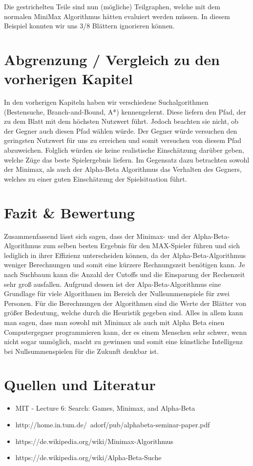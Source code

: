 Die gestrichelten Teile sind nun (mögliche) Teilgraphen, welche mit dem normalen MiniMax Algorithmus hätten evaluiert werden müssen. In diesem Beispiel konnten wir uns 3/8 Blättern ignorieren können.

\section{Abgrenzung / Vergleich zu den vorherigen Kapitel}

In den vorherigen Kapiteln haben wir verschiedene Suchalgorithmen (Bestensuche, Branch-and-Bound, A*) kennengelernt. Diese liefern den Pfad, der zu dem Blatt mit dem höchsten Nutzwert führt. Jedoch beachten sie nicht, ob der Gegner auch diesen Pfad wählen würde. Der Gegner würde versuchen den geringsten Nutzwert für uns zu erreichen und somit versuchen von diesem Pfad abzuweichen. Folglich würden sie keine realistische Einschätzung darüber geben, welche Züge das beste Spielergebnis liefern. Im Gegensatz dazu betrachten sowohl der Minimax, als auch der Alpha-Beta Algorithmus das Verhalten des Gegners, welches zu einer guten Einschätzung der Spielsituation führt.



\section{Fazit \& Bewertung}

Zusammenfassend lässt sich sagen, dass der Minimax- und der Alpha-Beta-Algorithmus zum selben besten Ergebnis für den MAX-Spieler führen und sich lediglich in ihrer Effizienz unterscheiden können, da der Alpha-Beta-Algorithmus weniger Berechnungen und somit eine kürzere Rechnungszeit benötigen kann. Je nach Suchbaum kann die Anzahl der Cutoffs und die Einsparung der Rechenzeit sehr groß ausfallen. Aufgrund dessen ist der Alpa-Beta-Algorithmus eine Grundlage für viele Algorithmen im Bereich der Nullsummenspiele für zwei Personen. Für die Berechnungen der Algorithmen sind die Werte der Blätter von größer Bedeutung, welche durch die Heuristik gegeben sind. Alles in allem kann man sagen, dass man sowohl mit Minimax als auch mit Alpha Beta einen Computergegner programmieren kann, der es einem Menschen sehr schwer, wenn nicht sogar unmöglich, macht zu gewinnen und somit eine künstliche Intelligenz bei Nullsummenspielen für die Zukunft denkbar ist.


\section{Quellen und Literatur}

\begin{itemize}
\item MIT - Lecture 6: Search: Games, Minimax, and Alpha-Beta
\item http://home.in.tum.de/~adorf/pub/alphabeta-seminar-paper.pdf
\item https://de.wikipedia.org/wiki/Minimax-Algorithmus
\item https://de.wikipedia.org/wiki/Alpha-Beta-Suche
\end{itemize}
